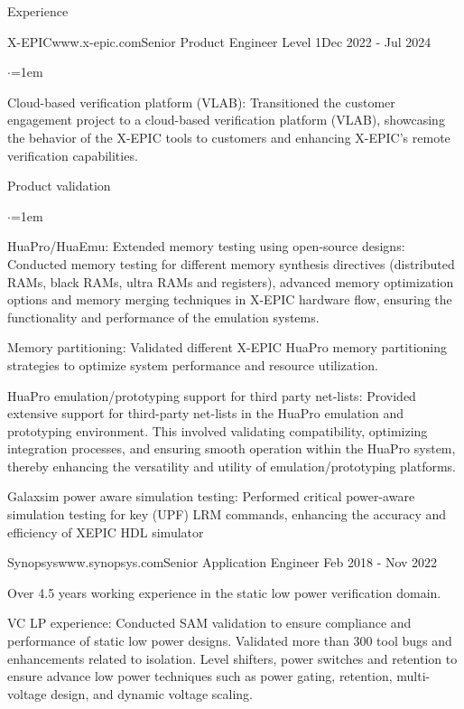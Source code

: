 \documentclass[
11pt, %
]{./assets/resume} %
\begin{document}
\begin{rSection}{Experience}
\begin{rSubsectionX}{X-EPIC}{www.x-epic.com}{Senior Product Engineer Level 1}{Dec 2022 - Jul 2024}
\begin{list}{$\cdot$}{\leftmargin=1em}
			\item Cloud-based verification platform (VLAB): Transitioned the customer engagement project to a cloud-based verification platform (VLAB), showcasing the behavior of the X-EPIC tools to customers and enhancing X-EPIC's remote verification capabilities.
		\end{list}
		\item Product validation
		\begin{list}{$\cdot$}{\leftmargin=1em}
			\setlength{\itemsep}{-0.5em} \vspace{-0.5em}
			\item HuaPro/HuaEmu: Extended memory testing using open-source designs: Conducted memory testing for different memory synthesis directives (distributed RAMs, black RAMs, ultra RAMs and registers), advanced memory optimization options and memory merging techniques in X-EPIC hardware flow, ensuring the functionality and performance of the emulation systems.
			\item Memory partitioning: Validated different X-EPIC HuaPro memory partitioning strategies to optimize system performance and resource utilization.
			\item HuaPro emulation/prototyping support for third party net-lists: Provided extensive support for third-party net-lists in the HuaPro emulation and prototyping environment. This involved validating compatibility, optimizing integration processes, and ensuring smooth operation within the HuaPro system, thereby enhancing the versatility and utility of emulation/prototyping platforms.
			\item Galaxsim power aware simulation testing: Performed critical power-aware simulation testing for key (UPF) LRM commands, enhancing the accuracy and efficiency of XEPIC HDL simulator
		\end{list}
	\end{rSubsectionX}
	\begin{rSubsectionX}{Synopsys}{www.synopsys.com}{Senior Application Engineer }{Feb 2018 - Nov 2022}
		\item Over 4.5 years working experience in the static low power verification domain.
		\item VC LP experience: Conducted SAM validation to ensure compliance and performance of static low power designs. Validated more than 300 tool bugs and enhancements related to isolation. Level shifters, power switches and retention to ensure advance low power techniques such as power gating, retention, multi-voltage design, and dynamic voltage scaling.

\end{rSubsectionX}
\end{rSection}
\end{document}
